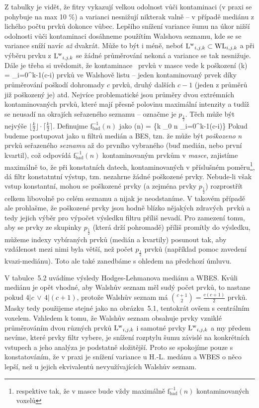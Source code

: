     Z tabulky je vidět, že fitry vykazují velkou odolnost vůči kontaminaci (v praxi se pohybuje na max 10 \%) a varianci nesnižují nikterak valně -- v případě mediánu z lichého počtu prvků dokonce vůbec. Lepšího snížení variance šumu na úkor nižší odolnosti vůči kontaminaci dosáhneme použítím Walshova seznamu, kde se se variance sníží navíc \emph{až} dvakrát. Může to být i méně, neboť ${\mathrm{L^w}_{i,j,k}} \subset {\mathrm{WL}_{i,j,k}}$ a při výběru prvku z ${\mathrm{L^w}_{i,j,k}}$ se žádné průměrování nekoná a variance se tak nesnižuje. Dále je třeba si uvědomit, že kontaminace \kk~prvků v masce vede k poškození
    \beq
    (k) = \sum_{i=0}^{k-1}(c-i)
    \eeq
    prvků ve Walshově listu -- jeden kontaminovaný prvek díky průměrování poškodí dohromady $c$ prvků, druhý dalších $c-1$ (jeden z průměrů již poškozený je) atd. Nejvíce problematické jsou průměry dvou extrémních kontaminovaných prvků, které mají přesně polovinu maximální intenzity a tudíž se neusadí na okrajích seřazeného seznamu -- označme je $p_{\frac{1}{2}}$. Těch může být nejvýše $\lfloor\frac{k}{2}\rfloor\cdot\lceil\frac{k}{2}\rceil$. Definujme $\mathrm{f_{bad}^{-1}}(n)$ jako
    \beq
    (n) = \max\bigg\{k \in \Nn_0 \;\bigg\vert\; n \geq \sum_{i=0}^{k-1}(c-i)\bigg\}
    \eeq
    Pokud budeme postupovat jako u filtrů medián a BES, tzn. že může být \emph{poškozeno} \textit{n} prvků seřazeného \emph{seznamu} až do prvního vybraného (buď medián, nebo první kvartil), což odpovídá $\mathrm{f_{bad}^{-1}}(n)$ kontaminovaným prvkům v \emph{masce}, zajistíme maximálně to, že při konstatních datech, kontaminovaných v příslušném poměru\footnote{respektive tak, že v masce bude vždy maximálně $\mathrm{f_{bad}^{-1}}(n)$ kontaminovaných voxelů}, dá filtr konstatntní výstup, tzn. nezahrne žádné poškozené prvky. Nebude-li však vstup konstantní, mohou se poškozené prvky (a zejména prvky $p_{\frac{1}{2}}$) rozprostřít celkem libovolně po celém seznamu a nijak je neodstaníme. V takovém případě ale prohlašme, že poškozené prvky jsou hodně blízko nějakých \bq zdravých\eq ~prvků a tedy jejich výběr pro výpočet výsledku filtru příliš nevadí. Pro zamezení tomu, aby se prvky ze skupinky $p_{\frac{1}{2}}$ (která drží pohromadě) příliš promítly do výsledku, můžeme indexy vybíraných prvků (medián a kvartily) posunout tak, aby vzdálenost mezi nimi byla větší, než počet $p_{\frac{1}{2}}$ prvků (například pomoc zavedení kvazi-mediánu). Toto ale také zanedbáme s ohledem na předchozí úmluvu.

    V tabulce~5.2 uvádíme výsledy Hodges-Lehmanova mediánu a WBES. Kvůli mediánu je opět vhodné, aby Walshův seznam měl sudý počet prvků, to nastane pokud $4|c \,\vee\, 4|(c+1)$, protože Walshův seznam má ${c+1 \choose 2} = \frac{c(c+1)}{2}$ prvků. Masky tedy použijeme stejné jako na obrázku~5.1, tentokrát ovšem s centrálním voxelem. Vzhledem k tomu, že Walshův seznam obsahuje prvky vzniklé průměrováním dvou různých prvků ${\mathrm{L^w}_{i,j,k}}$ i samotné prvky ${\mathrm{L^w}_{i,j,k}}$ a my předem nevíme, které prvky filtr vybere, je snížení rozptylu šumu závislé na konkrétních vstupech a jeho analýza je podstatně složitější. Proto se spokojíme pouze s konstatováním, že v praxi je snížení variance u H.-L. medánu a WBES o něco lepší, než u jejich ekvivalentů nevyužívajících Walshův seznam.

